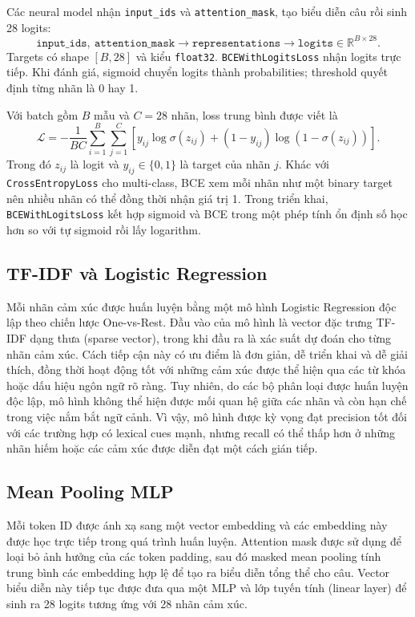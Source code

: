 \documentclass[12pt,a4paper]{article}
\begin{document}
Các neural model nhận \texttt{input\_ids} và \texttt{attention\_mask}, tạo biểu diễn câu rồi sinh 28 logits:
\begin{equation}
\texttt{input\_ids},\ \texttt{attention\_mask}\rightarrow
\texttt{representations}\rightarrow\texttt{logits}\in\mathbb{R}^{B\times28}.
\end{equation}
Targets có shape $[B,28]$ và kiểu \texttt{float32}. \texttt{BCEWithLogitsLoss} nhận logits trực tiếp. Khi đánh giá, sigmoid chuyển logits thành probabilities; threshold quyết định từng nhãn là 0 hay 1.

Với batch gồm $B$ mẫu và $C=28$ nhãn, loss trung bình được viết là
\begin{equation}
\mathcal{L}=-\frac{1}{BC}\sum_{i=1}^{B}\sum_{j=1}^{C}
\left[y_{ij}\log\sigma(z_{ij})+(1-y_{ij})\log\left(1-\sigma(z_{ij})\right)\right].
\end{equation}
Trong đó $z_{ij}$ là logit và $y_{ij}\in\{0,1\}$ là target của nhãn $j$. Khác với \texttt{CrossEntropyLoss} cho multi-class, BCE xem mỗi nhãn như một binary target nên nhiều nhãn có thể đồng thời nhận giá trị 1. Trong triển khai, \texttt{BCEWithLogitsLoss} kết hợp sigmoid và BCE trong một phép tính ổn định số học hơn so với tự sigmoid rồi lấy logarithm.

\subsection{TF-IDF và Logistic Regression}

Mỗi nhãn cảm xúc được huấn luyện bằng một mô hình Logistic Regression độc lập theo chiến lược One-vs-Rest. Đầu vào của mô hình là vector đặc trưng TF-IDF dạng thưa (sparse vector), trong khi đầu ra là xác suất dự đoán cho từng nhãn cảm xúc. Cách tiếp cận này có ưu điểm là đơn giản, dễ triển khai và dễ giải thích, đồng thời hoạt động tốt với những cảm xúc được thể hiện qua các từ khóa hoặc dấu hiệu ngôn ngữ rõ ràng. Tuy nhiên, do các bộ phân loại được huấn luyện độc lập, mô hình không thể hiện được mối quan hệ giữa các nhãn và còn hạn chế trong việc nắm bắt ngữ cảnh. Vì vậy, mô hình được kỳ vọng đạt precision tốt đối với các trường hợp có lexical cues mạnh, nhưng recall có thể thấp hơn ở những nhãn hiếm hoặc các cảm xúc được diễn đạt một cách gián tiếp.

\subsection{Mean Pooling MLP}

Mỗi token ID được ánh xạ sang một vector embedding và các embedding này được học trực tiếp trong quá trình huấn luyện. Attention mask được sử dụng để loại bỏ ảnh hưởng của các token padding, sau đó masked mean pooling tính trung bình các embedding hợp lệ để tạo ra biểu diễn tổng thể cho câu. Vector biểu diễn này tiếp tục được đưa qua một MLP và lớp tuyến tính (linear layer) để sinh ra 28 logits tương ứng với 28 nhãn cảm xúc.
\end{document}
